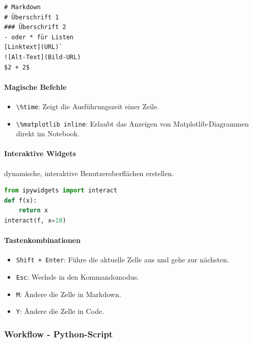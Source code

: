 \documentclass{vorlage-design-main}
\begin{document}
\begin{lstlisting}
# Markdown
# Überschrift 1
### Überschrift 2
- oder * für Listen
[Linktext](URL)`
![Alt-Text](Bild-URL)
$2 + 2$
\end{lstlisting}

\paragraph{Magische Befehle}\label{magische-befehle}

\begin{itemize}

\item
  \verb|\%time|: Zeigt die Ausführungszeit einer
  Zeile.
\item
  \verb|\%matplotlib inline|: Erlaubt das Anzeigen
  von Matplotlib-Diagrammen direkt im Notebook.
\end{itemize}

\paragraph{Interaktive Widgets}\label{interaktive-widgets}

dynamische, interaktive Benutzeroberflächen erstellen.

\begin{lstlisting}[language=Python]
from ipywidgets import interact
def f(x):
    return x
interact(f, x=10)
\end{lstlisting}

\paragraph{Tastenkombinationen}\label{tastenkombinationen}

\begin{itemize}

\item
  \verb|Shift + Enter|: Führe die aktuelle Zelle aus
  und gehe zur nächsten.
\item
  \verb|Esc|: Wechsle in den Kommandomodus.
\item
  \verb|M|: Ändere die Zelle in Markdown.
\item
  \verb|Y|: Ändere die Zelle in Code.
\end{itemize}

\subsubsection{Workflow - Python-Script}\label{workflow---python-script}
\end{document}

